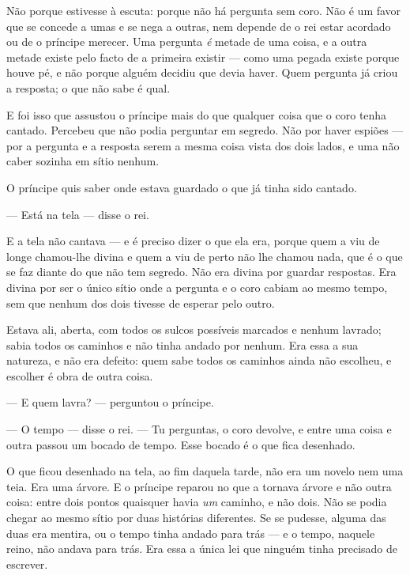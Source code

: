 \documentclass[livro.tex]{subfiles}
\begin{document}
\medskip

Não porque estivesse à escuta: porque não há pergunta sem coro. Não é um favor que se concede a
umas e se nega a outras, nem depende de o rei estar acordado ou de o príncipe merecer. Uma
pergunta \emph{é} metade de uma coisa, e a outra metade existe pelo facto de a primeira existir
--- como uma pegada existe porque houve pé, e não porque alguém decidiu que devia haver. Quem
pergunta já criou a resposta; o que não sabe é qual.

\medskip

E foi isso que assustou o príncipe mais do que qualquer coisa que o coro tenha cantado. Percebeu
que não podia perguntar em segredo. Não por haver espiões --- por a pergunta e a resposta serem a
mesma coisa vista dos dois lados, e uma não caber sozinha em sítio nenhum.

\medskip

O príncipe quis saber onde estava guardado o que já tinha sido cantado.

--- Está na tela --- disse o rei.

E a tela não cantava --- e é preciso dizer o que ela era, porque quem a viu de longe chamou-lhe
divina e quem a viu de perto não lhe chamou nada, que é o que se faz diante do que não tem
segredo. Não era divina por guardar respostas. Era divina por ser o único sítio onde a pergunta e
o coro cabiam ao mesmo tempo, sem que nenhum dos dois tivesse de esperar pelo outro.

\medskip

Estava ali, aberta, com todos os sulcos possíveis marcados e nenhum
lavrado; sabia todos os caminhos e não tinha andado por nenhum. Era essa a sua natureza, e não
era defeito: quem sabe todos os caminhos ainda não escolheu, e escolher é obra de outra coisa.

\medskip

--- E quem lavra? --- perguntou o príncipe.

--- O tempo --- disse o rei. --- Tu perguntas, o coro devolve, e entre uma coisa e outra passou
um bocado de tempo. Esse bocado é o que fica desenhado.

\medskip

O que ficou desenhado na tela, ao fim daquela tarde, não era um novelo nem uma teia. Era uma
árvore. E o príncipe reparou no que a tornava árvore e não outra coisa: entre dois pontos
quaisquer havia \emph{um} caminho, e não dois. Não se podia chegar ao mesmo sítio por duas
histórias diferentes. Se se pudesse, alguma das duas era mentira, ou o tempo tinha andado para
trás --- e o tempo, naquele reino, não andava para trás. Era essa a única lei que ninguém tinha
precisado de escrever.
\end{document}
